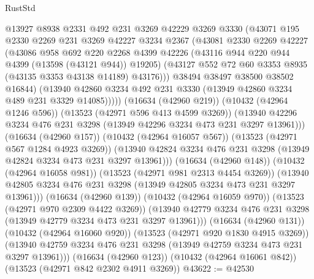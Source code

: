 \begin{lexlean}{RustStd}
\begin{coremodule}
                    @13927
                    @8938
                    @2331
                    @492
                    @231
                    @3269
                    @42229
                    @3269
                    @3330
                    (@43071
                      @195
                      @2330
                      @2269
                      @231
                      @3269
                      @42227
                      @3234
                      @2367
                      (@43081
                        @2330
                        @2269
                        @42227
                        (@43086
                          @958
                          @692
                          @220
                          @2268
                          @4399
                          @42226
                          (@43116 @944 @220 @944 @4399 (@13598 (@43121 @944)) @19205)
                          (@43127 @552 @72 @60 @3353 @8935 (@43135 @3353 @43138 @14189) @43176)))
                      @38494
                      @38497
                      @38500
                      @38502
                      @16844)
                    (@13940
                      @42860
                      @3234
                      @492
                      @231
                      @3330
                      (@13949 @42860 @3234 @489 @231 @3329 @14085)))))
              (@16634 (@42960 @219))
              (@10432 (@42964 @1246 @596))
              (@13523 (@42971 @596 @413 @4599 @3269))
              (@13940 @42296 @3234 @476 @231 @3298 (@13949 @42296 @3234 @473 @231 @3297 @13961)))
            (@16634 (@42960 @157))
            (@10432 (@42964 @16057 @567))
            (@13523 (@42971 @567 @1284 @4923 @3269))
            (@13940 @42824 @3234 @476 @231 @3298 (@13949 @42824 @3234 @473 @231 @3297 @13961)))
          (@16634 (@42960 @148))
          (@10432 (@42964 @16058 @981))
          (@13523 (@42971 @981 @2313 @4454 @3269))
          (@13940 @42805 @3234 @476 @231 @3298 (@13949 @42805 @3234 @473 @231 @3297 @13961)))
        (@16634 (@42960 @139))
        (@10432 (@42964 @16059 @970))
        (@13523 (@42971 @970 @2309 @4422 @3269))
        (@13940 @42779 @3234 @476 @231 @3298 (@13949 @42779 @3234 @473 @231 @3297 @13961)))
      (@16634 (@42960 @131))
      (@10432 (@42964 @16060 @920))
      (@13523 (@42971 @920 @1830 @4915 @3269))
      (@13940 @42759 @3234 @476 @231 @3298 (@13949 @42759 @3234 @473 @231 @3297 @13961)))
    (@16634 (@42960 @123))
    (@10432 (@42964 @16061 @842))
    (@13523 (@42971 @842 @2302 @4911 @3269))
@43622 := @42530

\end{coremodule}
\end{lexlean}
